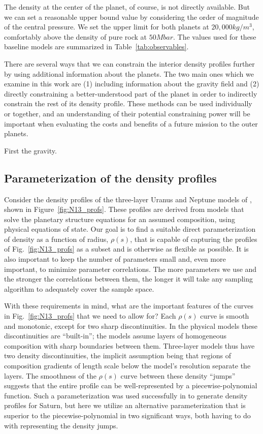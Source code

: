 The density at the center of the planet, of course, is not directly available.
But we can set a reasonable upper bound value by considering the order of
magnitude of the central pressure. We set the upper limit for both planets at
$20,000\unit{kg/m^3}$, comfortably above the density of pure rock at
${50}\unit{Mbar}$. The values used for these baseline models are summarized in
Table~\ref{tab:observables}.



There are several ways that we can constrain the interior density profiles
further by using additional information about the planets. The two main ones
which we examine in this work are (1) including information about the gravity
field and (2) directly constraining a better-understood part of the planet in
order to indirectly constrain the rest of its density profile. These methods can
be used individually or together, and an understanding of their potential
constraining power will be important when evaluating the costs and benefits of a
future mission to the outer planets.

First the gravity.

\subsection{Parameterization of the density profiles}\label{sec:params}

Consider the density profiles of the three-layer Uranus and Neptune models of
\citet{Nettelmann2013b}, shown in Figure~\ref{fig:N13_profs}. These profiles are
derived from models that solve the planetary structure equations for an assumed
composition, using physical equations of state. Our goal is to find a suitable
direct parameterization of density as a function of radius, $\rho(s)$, that is
capable of capturing the profiles of Fig.~\ref{fig:N13_profs} as a subset and is
otherwise as flexible as possible. It is also important to keep the number of
parameters small and, even more important, to minimize parameter correlations.
The more parameters we use and the stronger the correlations between them, the
longer it will take any sampling algorithm to adequately cover the sample space.

With these requirements in mind, what are the important features of the curves
in Fig.~\ref{fig:N13_profs} that we need to allow for? Each $\rho(s)$ curve is
smooth and monotonic, except for two sharp discontinuities. In the physical
models these discontinuities are ``built-in''; the models assume layers of
homogeneous composition with sharp boundaries between them. Three-layer models
thus have two density discontinuities, the implicit assumption being that
regions of composition gradients of length scale below the model's resolution
separate the layers. The smoothness of the $\rho(s)$ curve between these density
``jumps'' suggests that the entire profile can be well-represented by a
piecewise-polynomial function. Such a parameterization was used successfully in
\citep{Movshovitz2020} to generate density profiles for Saturn, but here we
utilize an alternative parameterization that is superior to the
piecewise-polynomial in two significant ways, both having to do with
representing the density jumps.

